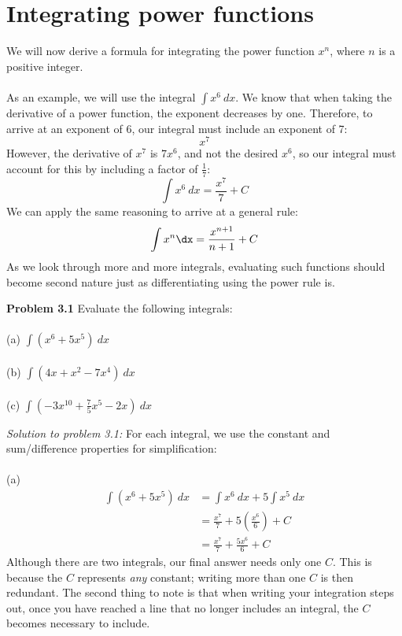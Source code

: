 \documentclass[11pt]{scrartcl}
\begin{document}
\section{Integrating power functions}
\noindent 
We will now derive a formula for integrating the power function $x^n$, where $n$ is a positive integer. \\
\\
\noindent As an example, we will use the integral $\int x^6 \ dx$. We know that when taking the derivative of a power function, the exponent decreases by one. Therefore, to arrive at an exponent of 6, our integral must include an exponent of 7: 
$$x^7$$ 
\noindent 
However, the derivative of $x^7$ is $7x^6$, and not the desired $x^6$, so our integral must account for this by including a factor of $\frac{1}{7}$: 
$$\int{x^6} \ dx=\frac{x^7}{7}+C$$
\noindent 
We can apply the same reasoning to arrive at a general rule: 
$$\int{x^n} \dx=\frac{x^{n+1}}{n+1} + C$$
\noindent 
As we look through more and more integrals, evaluating such functions should become second nature just as differentiating using the power rule is. 
\begin{tcolorbox}[colback=purple!5!white,colframe=purple!75!black]
\textbf{Problem 3.1} Evaluate the following integrals: \\
\\
\noindent 
(a) \;\; $\int{(x^6+5x^5)} \ dx$ \\
\\
\noindent 
(b) \;\; $\int{(4x+x^2-7x^4)} \ dx$ \\
\\
\noindent 
(c) \;\; $\int{(-3x^{10}+\frac{7}{5}x^5-2x)} \ dx$
\end{tcolorbox}
\noindent 
\textit{Solution to problem 3.1:} For each integral, we use the constant and sum/difference properties for simplification: \\
\\
\noindent 
(a) \begin{align*}
    \int{(x^6+5x^5)} \ dx &=\int{x^6 \ dx}+5\int{x^5 \ dx} \\
                          &=   \frac{x^7}{7}+5\left(\frac{x^6}{6}\right)+C \\
                          &= \frac{x^7}{7}+\frac{5x^6}{6}+C
\end{align*}
\noindent 
Although there are two integrals, our final answer needs only one $C$. This is because the $C$ represents \textit{any} constant; writing more than one $C$ is then redundant. The second thing to note is that when writing your integration steps out, once you have reached a line that no longer includes an integral, the $C$ becomes necessary to include. \\
\end{document}
